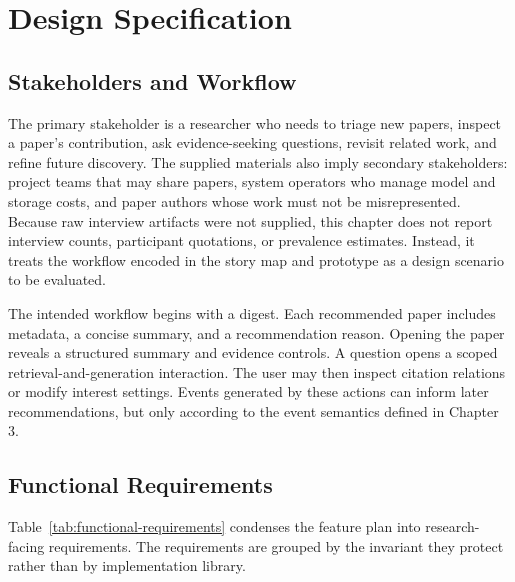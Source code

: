 ﻿%

\chapter{Design Specification}

\section{Stakeholders and Workflow}

The primary stakeholder is a researcher who needs to triage new papers, inspect a paper's contribution, ask evidence-seeking questions, revisit related work, and refine future discovery.
The supplied materials also imply secondary stakeholders: project teams that may share papers, system operators who manage model and storage costs, and paper authors whose work must not be misrepresented.
Because raw interview artifacts were not supplied, this chapter does not report interview counts, participant quotations, or prevalence estimates.
Instead, it treats the workflow encoded in the story map and prototype as a design scenario to be evaluated.

The intended workflow begins with a digest.
Each recommended paper includes metadata, a concise summary, and a recommendation reason.
Opening the paper reveals a structured summary and evidence controls.
A question opens a scoped retrieval-and-generation interaction.
The user may then inspect citation relations or modify interest settings.
Events generated by these actions can inform later recommendations, but only according to the event semantics defined in Chapter 3.

\section{Functional Requirements}

Table~\ref{tab:functional-requirements} condenses the feature plan into research-facing requirements.
The requirements are grouped by the invariant they protect rather than by implementation library.

